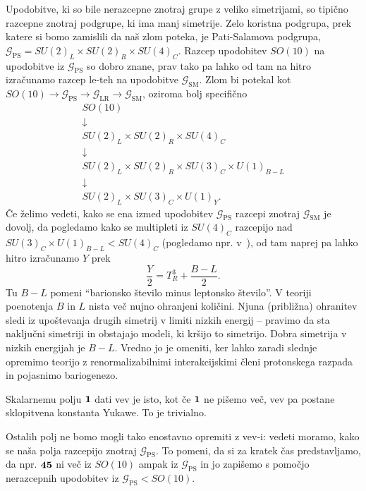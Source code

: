 Upodobitve, ki so bile nerazcepne znotraj grupe z veliko simetrijami, so tipično razcepne znotraj
podgrupe, ki ima manj simetrije. Zelo koristna podgrupa, prek katere si bomo zamislili da naš zlom
poteka, je Pati-Salamova podgrupa, $\mathcal{G}_\text{PS} = SU(2)_L \times SU(2)_R
\times SU(4)_C$. Razcep upodobitev $SO(10)$ na upodobitve iz $\mathcal{G}_\text{PS}$ so dobro
znane, prav tako pa lahko od tam na hitro izračunamo razcep le-teh na upodobitve
$\mathcal{G}_\text{SM}$. Zlom bi potekal kot $SO(10) \to \mathcal{G}_\text{PS} \to
\mathcal{G}_\text{LR} \to \mathcal{G}_\text{SM}$, oziroma bolj specifično
\begin{equation}
	\begin{array}{c}
		SO(10) \\
		\downarrow \\
		SU(2)_L \times SU(2)_R \times SU(4)_C \\
		\downarrow \\
		SU(2)_L \times SU(2)_R \times SU(3)_C \times U(1)_{B - L} \\
		\downarrow \\
		SU(2)_L \times SU(3)_C \times U(1)_Y.	
	\end{array}
	\label{phases}
\end{equation}
Če želimo vedeti, kako se ena izmed upodobitev $\mathcal{G}_\text{PS}$ razcepi znotraj
$\mathcal{G}_\text{SM}$ je dovolj, da pogledamo kako se multipleti iz $SU(4)_C$ razcepijo
nad $SU(3)_C \times U(1)_{B-L} < SU(4)_C$ (pogledamo npr. v~\cite[pg.~93]{slansky}), od tam 
naprej pa lahko hitro izračunamo $Y$ prek
\begin{equation}
	\frac{Y}{2} = T_R^3 + \frac{B - L}{2}.
\end{equation}
Tu $B - L$ pomeni "`barionsko število minus leptonsko število"'. V teoriji poenotenja $B$ in $L$
nista več nujno ohranjeni količini. Njuna (približna) ohranitev sledi iz upoštevanja drugih simetrij
v limiti nizkih energij -- pravimo da sta naključni simetriji in obstajajo modeli, ki kršijo to
simetrijo. Dobra simetrija v nizkih energijah je $B - L$. Vredno jo je omeniti, ker lahko zaradi
slednje opremimo teorijo z renormalizabilnimi interakcijskimi členi protonskega razpada in pojasnimo
bariogenezo.

Skalarnemu polju $\mathbf{1}$ dati vev je isto, kot če $\mathbf{1}$ ne pišemo več, vev pa postane
sklopitvena konstanta Yukawe. To je trivialno.

Ostalih polj ne bomo mogli tako enostavno opremiti z vev-i: vedeti moramo, kako se naša polja
razcepijo znotraj $\mathcal{G}_\text{PS}$. To pomeni, da si za kratek čas predstavljamo, da
npr. $\mathbf{45}$ ni več iz $SO(10)$ ampak iz $\mathcal{G}_\text{PS}$ in jo zapišemo s
pomočjo nerazcepnih upodobitev iz $\mathcal{G}_\text{PS} < SO(10)$.

